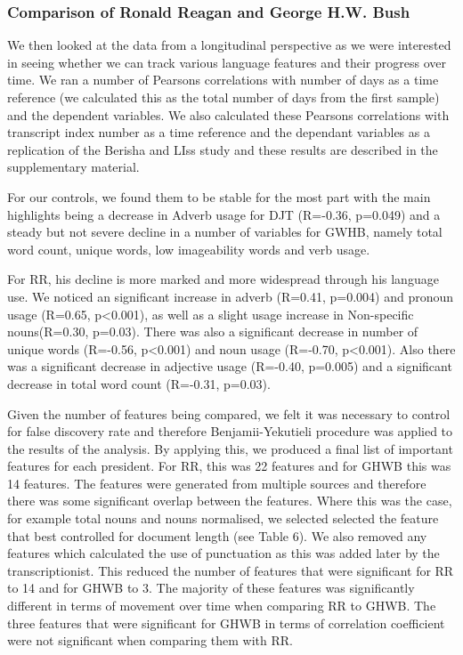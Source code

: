 \documentclass[12pt]{article}
\begin{document}
\subsubsection{Comparison of Ronald Reagan and George H.W. Bush}
We then looked at the data from a longitudinal perspective as we were interested in seeing whether we can track various language features and their progress over time. We ran a number of Pearsons correlations with number of days as a time reference (we calculated this as the total number of days from the first sample) and the dependent variables. We also calculated these Pearsons correlations with transcript index number as a time reference and the dependant variables as a replication of the Berisha and LIss study \cite{Berisha2015} and these results are described in the supplementary material.
\par 
For our controls, we found them to be stable for the most part with the main highlights being a decrease in Adverb usage for DJT (R=-0.36, p=0.049) and a steady but not severe decline in a number of variables for GWHB, namely total word count, unique words, low imageability words and verb usage.
\par 
For RR, his decline is more marked and more widespread through his language use. We noticed an significant increase in adverb (R=0.41, p=0.004) and pronoun usage (R=0.65, p\textless0.001), as well as a slight usage increase in Non-specific nouns(R=0.30, p=0.03). There was also a significant decrease in number of unique words (R=-0.56, p\textless0.001) and noun usage (R=-0.70, p\textless0.001). Also there was a significant decrease in adjective usage (R=-0.40, p=0.005) and a significant decrease in total word count (R=-0.31, p=0.03). 
\par
Given the number of features being compared, we felt it was necessary to control for false discovery rate and therefore Benjamii-Yekutieli procedure was applied to the results of the analysis. By applying this, we produced a final list of important features for each president. For RR, this was 22 features and for GHWB this was 14 features.  The features were generated from multiple sources and therefore there was some significant overlap between the features. Where this was the case, for example total nouns and nouns normalised,  we selected selected the feature that best controlled for document length (see Table 6). We also removed any features which calculated the use of punctuation as this was added later by the transcriptionist. This reduced the number of features that were significant for RR to 14 and for GHWB to 3. The majority of these features was significantly different in terms of movement over time when comparing RR to GHWB. The three features that were significant for GHWB in terms of correlation coefficient were not significant when comparing them with RR.
\end{document}

